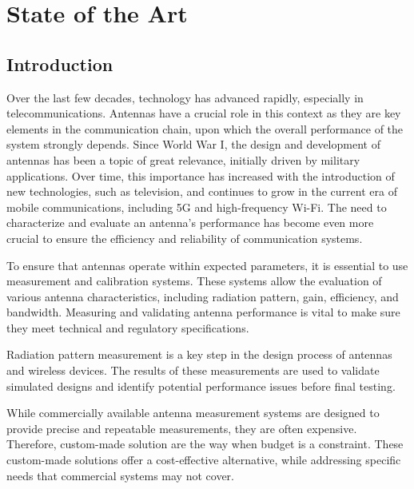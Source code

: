 \chapter{State of the Art}
\label{cap2:State_Of_The_Art}

\section{Introduction}

Over the last few decades, technology has advanced rapidly, especially in telecommunications. Antennas have a crucial role in this context as they are key elements in the communication chain, upon which the overall performance of the system strongly depends. Since World War I, the design and development of antennas has been a topic of great relevance, initially driven by military applications. Over time, this importance has increased with the introduction of new technologies, such as television, and continues to grow in the current era of mobile communications, including 5G and high-frequency Wi-Fi. The need to characterize and evaluate an antenna's performance has become even more crucial to ensure the efficiency and reliability of communication systems.


To ensure that antennas operate within expected parameters, it is essential to use measurement and calibration systems. These systems allow the evaluation of various antenna characteristics, including radiation pattern, gain, efficiency, and bandwidth. Measuring and validating antenna performance is vital to make sure they meet technical and regulatory specifications.


Radiation pattern measurement is a key step in the design process of antennas and wireless devices. The results of these measurements are used to validate simulated designs and identify potential performance issues before final testing.


While commercially available antenna measurement systems are designed to provide precise and repeatable measurements, they are often expensive. Therefore, custom-made solution are the way when budget is a constraint. These custom-made solutions offer a cost-effective alternative, while addressing specific needs that commercial systems may not cover.

